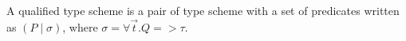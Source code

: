 \begin{defn}
  A qualified type scheme is a pair of type scheme with a set of predicates written as $(P \mid \sigma)$,
  where $\sigma = \forall \vec{t}. Q => \tau$.
\end{defn}

